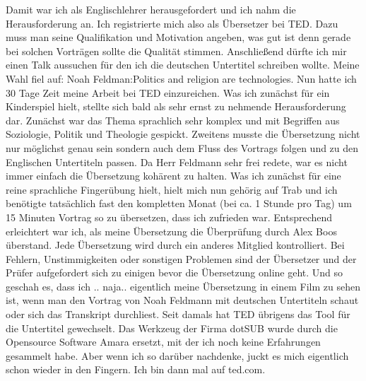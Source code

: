 Damit war ich als Englischlehrer herausgefordert und ich nahm die Herausforderung an. Ich registrierte mich also als Übersetzer bei TED. Dazu muss man seine Qualifikation und Motivation angeben, was gut ist denn gerade bei solchen Vorträgen sollte die Qualität stimmen. Anschließend dürfte ich mir einen Talk aussuchen für den ich die deutschen Untertitel schreiben wollte. Meine Wahl fiel auf: Noah Feldman:Politics and religion are technologies. 
Nun hatte ich 30 Tage Zeit meine Arbeit bei TED einzureichen. Was ich zunächst für ein Kinderspiel hielt, stellte sich bald als sehr ernst zu nehmende Herausforderung dar. Zunächst war das Thema sprachlich sehr komplex und mit Begriffen aus Soziologie, Politik und Theologie gespickt. Zweitens musste die Übersetzung nicht nur möglichst genau sein sondern auch dem Fluss des Vortrags folgen und zu den Englischen Untertiteln passen. Da Herr Feldmann sehr frei redete, war es nicht immer einfach die Übersetzung kohärent zu halten. Was ich zunächst für eine reine sprachliche Fingerübung hielt, hielt mich nun gehörig auf Trab und ich benötigte tatsächlich fast den kompletten Monat (bei ca. 1 Stunde pro Tag) um 15 Minuten Vortrag so zu übersetzen, dass ich zufrieden war. 
Entsprechend erleichtert war ich, als meine Übersetzung die Überprüfung durch Alex Boos überstand. Jede Übersetzung wird durch ein anderes Mitglied kontrolliert. Bei Fehlern, Unstimmigkeiten oder sonstigen Problemen sind der Übersetzer und der Prüfer aufgefordert sich zu einigen bevor die Übersetzung online geht.
Und so geschah es, dass ich .. naja.. eigentlich meine Übersetzung in einem Film zu sehen ist, wenn man den Vortrag von Noah Feldmann mit deutschen Untertiteln schaut oder sich das Transkript durchliest. 
Seit damals hat TED übrigens das Tool für die Untertitel gewechselt. Das Werkzeug der Firma dotSUB wurde durch die Opensource Software Amara ersetzt, mit der ich noch keine Erfahrungen gesammelt habe. Aber wenn ich so darüber nachdenke, juckt es mich eigentlich schon wieder in den Fingern. Ich bin dann mal auf ted.com.
